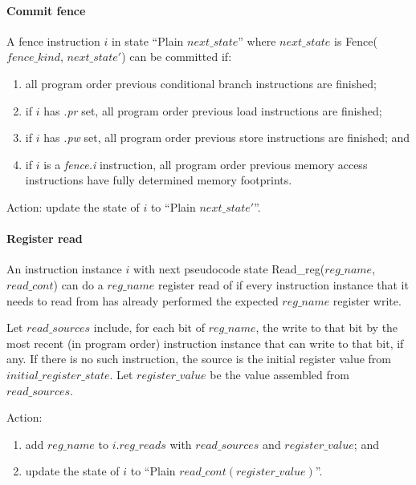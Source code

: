 \paragraph{Commit fence}\label{omm:thread:commit_barrier}
A fence instruction $i$ in state ``{\sc Plain} $next\_state$'' where $next\_state$ is {\sc Fence}($fence\_kind$, $next\_state'$) can be committed if:
\begin{enumerate}
\item all program order previous conditional branch instructions are finished;
\item if $i$ has {\em .pr} set, all program order previous load instructions are finished;
\item if $i$ has {\em .pw} set, all program order previous store instructions are finished; and
\item if $i$ is a {\em fence.i} instruction, all program order previous memory access instructions have fully determined memory footprints. 
\end{enumerate}
Action: update the state of $i$ to ``{\sc Plain} $next\_state'$''.


\paragraph{Register read}\label{omm:thread:reg_read}
An instruction instance $i$ with next pseudocode state {\sc Read\_reg}($reg\_name$, $read\_cont$) can do a $reg\_name$ register read of if every instruction instance that it needs to read from has already performed the expected $reg\_name$ register write.

Let $read\_sources$ include, for each bit of $reg\_name$, the write to that bit by the most recent (in program order) instruction instance that can write to that bit, if any. If there is no such instruction, the source is the initial register value from $initial\_register\_state$.
Let  $register\_value$ be the value assembled from $read\_sources$.

Action:
\begin{enumerate}
\item add $reg\_name$ to $i.reg\_reads$ with $read\_sources$ and $register\_value$; and
\item update the state of $i$ to ``{\sc Plain} $read\_cont(register\_value)$''.
\end{enumerate}


